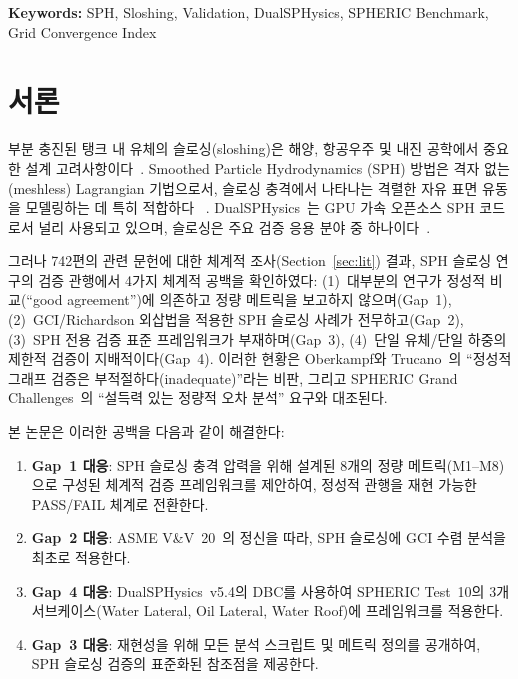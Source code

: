 \documentclass[11pt]{article}
\newcommand{\sref}[1]{Section~\ref{#1}}
\begin{document}
\bigskip
\begin{minipage}{0.9\textwidth}
\textbf{Keywords:} SPH, Sloshing, Validation, DualSPHysics, SPHERIC Benchmark, Grid Convergence Index
\end{minipage}
\newpage


\section{서론} \label{sec:intro}
\setcounter{equation}{0}


부분 충진된 탱크 내 유체의 슬로싱(sloshing)은 해양, 항공우주 및 내진 공학에서
중요한 설계 고려사항이다~\cite{Ibrahim2005}.
Smoothed Particle Hydrodynamics (SPH) 방법은 격자 없는(meshless) Lagrangian 기법으로서,
슬로싱 충격에서 나타나는 격렬한 자유 표면 유동을 모델링하는 데 특히 적합하다%
~\cite{Monaghan2005, Violeau2012}.
DualSPHysics~\cite{Dominguez2022}는 GPU 가속 오픈소스 SPH 코드로서 널리 사용되고 있으며,
슬로싱은 주요 검증 응용 분야 중 하나이다~\cite{English2022}.


그러나 742편의 관련 문헌에 대한 체계적 조사(\sref{sec:lit}) 결과, SPH 슬로싱 연구의
검증 관행에서 4가지 체계적 공백을 확인하였다:
(1)~대부분의 연구가 정성적 비교(``good agreement'')에 의존하고 정량 메트릭을
보고하지 않으며(Gap~1),
(2)~GCI/Richardson 외삽법을 적용한 SPH 슬로싱 사례가 전무하고(Gap~2),
(3)~SPH 전용 검증 표준 프레임워크가 부재하며(Gap~3),
(4)~단일 유체/단일 하중의 제한적 검증이 지배적이다(Gap~4).
이러한 현황은 Oberkampf와 Trucano~\cite{Oberkampf2002}의 ``정성적 그래프 검증은
부적절하다(inadequate)''라는 비판, 그리고 SPHERIC Grand Challenges~\cite{Vacondio2020}의
``설득력 있는 정량적 오차 분석'' 요구와 대조된다.


본 논문은 이러한 공백을 다음과 같이 해결한다:
\begin{enumerate}
    \item \textbf{Gap~1 대응}: SPH 슬로싱 충격 압력을 위해 설계된 8개의 정량 메트릭(M1--M8)
          으로 구성된 체계적 검증 프레임워크를 제안하여, 정성적 관행을 재현 가능한
          PASS/FAIL 체계로 전환한다.
    \item \textbf{Gap~2 대응}: ASME V\&V~20~\cite{ASME2009}의 정신을 따라,
          SPH 슬로싱에 GCI 수렴 분석을 최초로 적용한다.
    \item \textbf{Gap~4 대응}: DualSPHysics~v5.4의 DBC를 사용하여 SPHERIC Test~10의
          3개 서브케이스(Water Lateral, Oil Lateral, Water Roof)에 프레임워크를 적용한다.
    \item \textbf{Gap~3 대응}: 재현성을 위해 모든 분석 스크립트 및 메트릭 정의를 공개하여,
          SPH 슬로싱 검증의 표준화된 참조점을 제공한다.
\end{enumerate}
\end{document}
